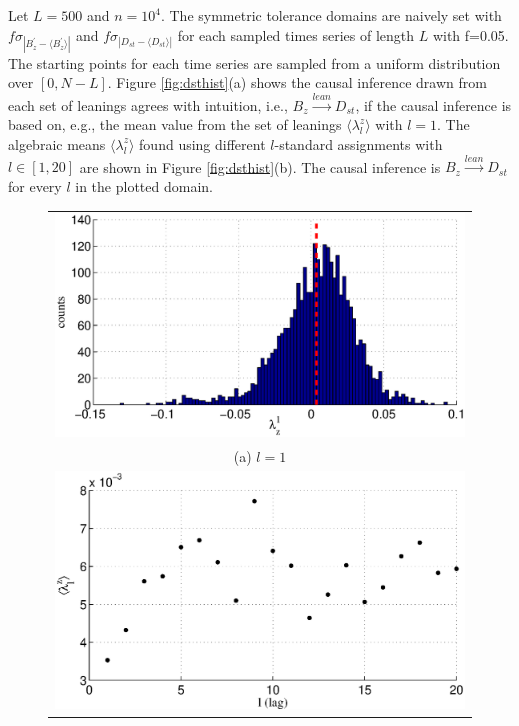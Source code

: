 \documentclass[twocolumn,aps,pre,groupedaddress]{revtex4-1}
\begin{document}
Let $L=500$ and $n=10^4$.  The symmetric tolerance domains are naively set with $f\sigma_{|B_{z}^\prime-\langle B_{z}^\prime\rangle|}$ and $f\sigma_{|D_{st}-\langle D_{st}\rangle|}$ for each sampled times series of length $L$ with f=0.05.  The starting points for each time series are sampled from a uniform distribution over $[0,N-L]$.  Figure \ref{fig:dsthist}(a) shows the causal inference drawn from each set of leanings agrees with intuition, i.e., $B_{z}\xrightarrow{lean}D_{st}$, if the causal inference is based on, e.g., the mean value from the set of leanings $\langle\lambda^z_l\rangle$ with $l=1$.  The algebraic means $\langle\lambda^z_l\rangle$ found using different $l$-standard assignments with $l\in[1,20]$ are shown in Figure \ref{fig:dsthist}(b).  The causal inference is $B_{z}\xrightarrow{lean}D_{st}$ for every $l$ in the plotted domain.
\begin{figure}[ht]
\begin{tabular}{c}
\includegraphics[scale=0.40]{SolarDataBzNormDst.eps} \\ 
(a) $l=1$\\
\includegraphics[scale=0.40]{SolarDataBzNormDst_difflags.eps} \\ 

\end{tabular}
\end{figure}
\end{document}
